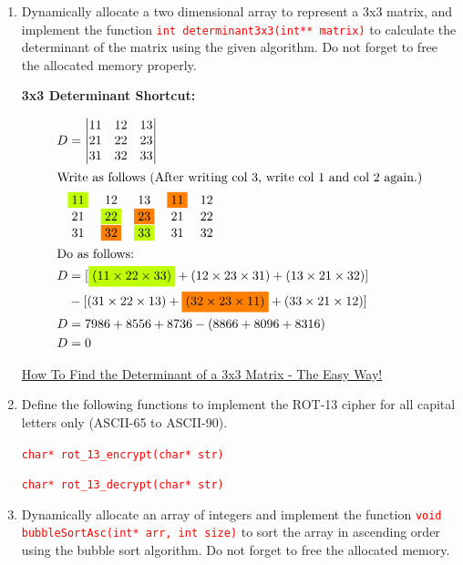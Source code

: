 \documentclass[12pt]{article}
\begin{document}
\begin{enumerate}
    \item Dynamically allocate a two dimensional array to represent a 3x3 matrix, and implement the function 
    \textcolor{red}{\texttt{int determinant3x3(int** matrix)}} to calculate the determinant of the matrix using 
    the given algorithm. Do not forget to free the allocated memory properly.

    \textbf{3x3 Determinant Shortcut:}

\begin{align*}
    D &= 
    \begin{vmatrix}
    11 & 12 & 13 \\
    21 & 22 & 23 \\
    31 & 32 & 33 \\
    \end{vmatrix} \\
    \intertext{Write as follows (After writing col 3, write col 1 and col 2 again.)}
    &\begin{matrix}
    \colorbox{lime}{11} & 12 & 13 & \colorbox{orange}{11} & 12 \\
    21 & \colorbox{lime}{22} & \colorbox{orange}{23} & 21 & 22 \\
    31 & \colorbox{orange}{32} & \colorbox{lime}{33} & 31 & 32 \\
    \end{matrix} \\
    \intertext{Do as follows:}
    D &= [\colorbox{lime}{$(11 \times 22 \times 33)$} + (12 \times 23 \times 31) + (13 \times 21 \times 32) ] \\&- [(31 \times 22 \times 13) + \colorbox{orange}{$(32 \times 23 \times 11)$} + (33 \times 21 \times 12) ]\\
    D &= 7986 + 8556 + 8736 - (8866 + 8096 + 8316) \\
    D &= 0  \\
\end{align*}

    \begin{center}
        \href{https://www.youtube.com/watch?v=z5Yf7QwrotE}{How To Find the Determinant of a 3x3 Matrix - The Easy Way!}
    \end{center}

    \item Define the following functions to implement the ROT-13 cipher for all capital letters 
    only (ASCII-65 to ASCII-90).
    
    \textcolor{red}{\texttt{char* rot\_13\_encrypt(char* str)}}  
    
    \textcolor{red}{\texttt{char* rot\_13\_decrypt(char* str)}}


    \item Dynamically allocate an array of integers and implement the function 
    \textcolor{red}{\texttt{void bubbleSortAsc(int* arr, int size)}} to sort the array in ascending order 
    using the bubble sort algorithm. Do not forget to free the allocated memory.
    

\end{enumerate}
\end{document}
